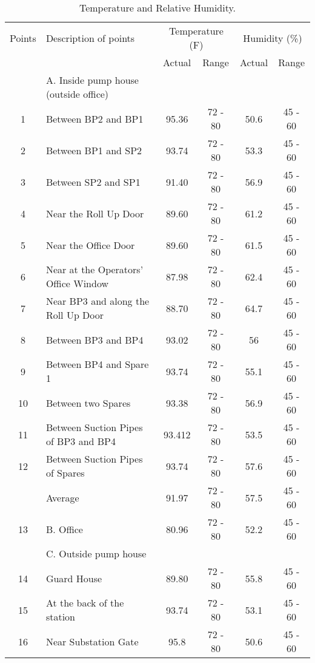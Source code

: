 \begin{table}[h]
	\caption{Temperature and Relative Humidity.}
	\label{ch04_tbl_wem01}
	{\footnotesize
\begin{tabular}{c|l|c|c|c|c}
\hline
Points & Description of points & \multicolumn{2}{c|}{Temperature (F)} & \multicolumn{2}{c}{Humidity (\%)} \\ 
\cline{3-6}
 &  & Actual & Range & Actual & Range \\ 
\hline
  & A. Inside pump house (outside office) &  &  &  &  \\ 
1 & Between BP2 and BP1 & 95.36 & 72 - 80 & 50.6 & 45 - 60 \\ 
2 & Between BP1 and SP2 & 93.74 & 72 - 80 & 53.3 & 45 - 60 \\ 
3 & Between SP2 and SP1 & 91.40 & 72 - 80 & 56.9 & 45 - 60 \\ 
4 & Near the Roll Up Door & 89.60 & 72 - 80 & 61.2 & 45 - 60 \\ 
5 & Near the Office Door & 89.60 & 72 - 80 & 61.5 & 45 - 60 \\ 
6 & Near at the Operators’ Office Window & 87.98 & 72 - 80 & 62.4 & 45 - 60 \\ 
7 & Near BP3 and along the Roll Up Door & 88.70 & 72 - 80 & 64.7 & 45 - 60 \\ 
8 & Between BP3 and BP4 & 93.02 & 72 - 80 & 56 & 45 - 60 \\ 
9 & Between BP4 and Spare 1 & 93.74 & 72 - 80 & 55.1 & 45 - 60 \\ 
10 & Between two Spares & 93.38 & 72 - 80 & 56.9 & 45 - 60 \\ 
11 & Between Suction Pipes of BP3 and BP4 & 93.412 & 72 - 80 & 53.5 & 45 - 60 \\ 
12 & Between Suction Pipes of Spares & 93.74 & 72 - 80 & 57.6 & 45 - 60 \\ 
 & Average & 91.97 & 72 - 80 & 57.5 & 45 - 60 \\ 
\hline
13 & B. Office & 80.96 & 72 - 80 & 52.2 & 45 - 60 \\ 
\hline
 & C. Outside pump house &  &  &  &  \\ 
14 & Guard House & 89.80 & 72 - 80 & 55.8 & 45 - 60 \\ 
15 & At the back of the station & 93.74 & 72 - 80 & 53.1 & 45 - 60 \\ 
16 & Near Substation Gate & 95.8 & 72 - 80 & 50.6 & 45 - 60 \\ 
\hline
\end{tabular}
}
\end{table}
